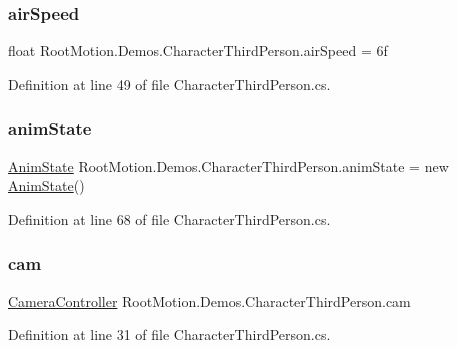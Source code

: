 \subsubsection{\texorpdfstring{air\+Speed}{airSpeed}}
{\footnotesize\ttfamily float Root\+Motion.\+Demos.\+Character\+Third\+Person.\+air\+Speed = 6f}



Definition at line 49 of file Character\+Third\+Person.\+cs.

\mbox{\label{class_root_motion_1_1_demos_1_1_character_third_person_a8c25b043492bed516a498f1fcc9c3d60}} 
\subsubsection{\texorpdfstring{anim\+State}{animState}}
{\footnotesize\ttfamily \mbox{\hyperlink{struct_root_motion_1_1_demos_1_1_character_third_person_1_1_anim_state}{Anim\+State}} Root\+Motion.\+Demos.\+Character\+Third\+Person.\+anim\+State = new \mbox{\hyperlink{struct_root_motion_1_1_demos_1_1_character_third_person_1_1_anim_state}{Anim\+State}}()}



Definition at line 68 of file Character\+Third\+Person.\+cs.

\mbox{\label{class_root_motion_1_1_demos_1_1_character_third_person_aa6ac2e1172a7e17dde8db10def50dfae}} 
\subsubsection{\texorpdfstring{cam}{cam}}
{\footnotesize\ttfamily \mbox{\hyperlink{class_root_motion_1_1_camera_controller}{Camera\+Controller}} Root\+Motion.\+Demos.\+Character\+Third\+Person.\+cam}



Definition at line 31 of file Character\+Third\+Person.\+cs.

